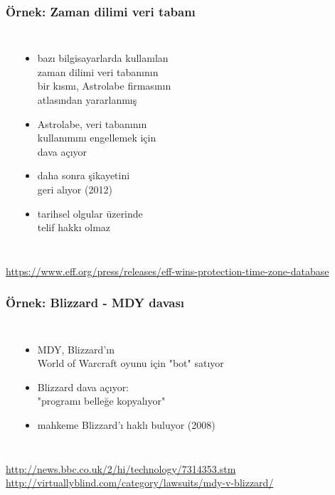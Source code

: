 \documentclass[dvipsnames]{beamer}
\theoremstyle{definition}
\theoremstyle{example}
\theoremstyle{plain}
\begin{document}
\begin{frame}
  \frametitle{Örnek: Zaman dilimi veri tabanı}

  \begin{columns}
    \begin{center}
    \end{center}

    \begin{itemize}
      \item bazı bilgisayarlarda kullanılan\\
        zaman dilimi veri tabanının\\
        bir kısmı, Astrolabe firmasının\\
        atlasından yararlanmış
      \item Astrolabe, veri tabanının\\
        kullanımını engellemek için\\
        dava açıyor
      \item daha sonra şikayetini\\
        geri alıyor (2012)
      \item tarihsel olgular üzerinde\\
        telif hakkı olmaz
    \end{itemize}
  \end{columns}

  \medskip
  \tiny{\url{https://www.eff.org/press/releases/eff-wins-protection-time-zone-database}}\\
\end{frame}

\begin{frame}
  \frametitle{Örnek: Blizzard - MDY davası}

  \begin{columns}
    \begin{center}
    \end{center}

    \begin{itemize}
      \item MDY, Blizzard'ın\\
        World of Warcraft oyunu için "bot" satıyor
      \item Blizzard dava açıyor:\\
        "programı belleğe kopyalıyor"
      \item mahkeme Blizzard'ı haklı buluyor (2008)
    \end{itemize}
  \end{columns}

  \medskip
  \tiny{\url{http://news.bbc.co.uk/2/hi/technology/7314353.stm}}\\
  \tiny{\url{http://virtuallyblind.com/category/lawsuits/mdy-v-blizzard/}}\\
\end{frame}
\end{document}
